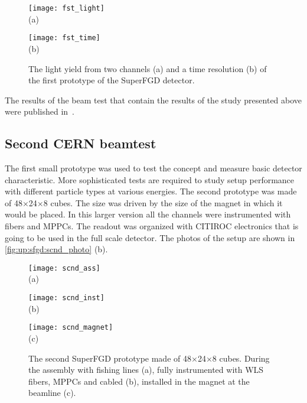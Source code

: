 \documentclass[main.tex]{subfiles}
\begin{document}
\begin{figure}[!ht]
	\centering
	\begin{minipage}{0.49\linewidth}
		\centering
		\texttt{[image: fst\_light]} \\ (a)
	\end{minipage}
	\begin{minipage}{0.49\linewidth}
		\centering
		\texttt{[image: fst\_time]} \\ (b)
	\end{minipage}
	\caption{The light yield from two channels (a) and a time resolution (b) of the first prototype of the SuperFGD detector.}
	\label{fig:up:sfgd:1st_res}
\end{figure}

The results of the beam test that contain the results of the study presented above were published in~\cite{Mineev2019}.

\subsection{Second CERN beamtest}
\label{sec:up:sfgd:beam2}
The first small prototype was used to test the concept and measure basic detector characteristic. More sophisticated tests are required to study setup performance with different particle types at various energies. The second prototype was made of 48$\times$24$\times$8 cubes. The size was driven by the size of the magnet in which it would be placed. In this larger version all the channels were instrumented with fibers and MPPCs. The readout was organized with CITIROC electronics that is going to be used in the full scale detector. The photos of the setup are shown in \autoref{fig:up:sfgd:scnd_photo} (b).

\begin{figure}[!ht]
	\centering
	\begin{minipage}{0.26\linewidth}
		\centering
		\texttt{[image: scnd\_ass]} \\ (a)
	\end{minipage}
	\begin{minipage}{0.36\linewidth}
		\centering
		\texttt{[image: scnd\_inst]} \\ (b)
	\end{minipage}
	\begin{minipage}{0.36\linewidth}
		\centering
		\texttt{[image: scnd\_magnet]} \\ (c)
	\end{minipage}
	\caption{The second SuperFGD prototype made of 48$\times$24$\times$8 cubes. During the assembly with fishing lines (a), fully instrumented with WLS fibers, MPPCs and cabled (b), installed in the magnet at the beamline (c).}
	\label{fig:up:sfgd:scnd_photo}
\end{figure}
\end{document}
